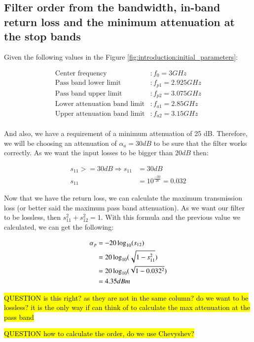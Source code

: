 \documentclass[12pt]{report} %
\newcommand{\question}[1]{\sethlcolor{red}\hl{QUESTION #1}}
\begin{document}
\subsection{Filter order from the bandwidth, in-band return loss and the minimum attenuation at the stop bands}

Given the following values in the Figure \ref{fig:introduction:initial_parameters}:

\begin{align*}
\text{Center frequency} & : f_0 = 3 GHz\\
\text{Pass band lower limit} & : f_{p1} = 2.925 GHz\\
\text{Pass band upper limit} & : f_{p2} = 3.075 GHz\\
\text{Lower attenuation band limit} & : f_{a1} = 2.85 GHz\\
\text{Upper attenuation band limit} & : f_{a2} = 3.15 GHz\\
\end{align*}

And also, we have a requirement of a minimum attenuation of 25 dB. Therefore, we will be choosing an attenuation of $\alpha_{a} = 30 dB$ to be sure that the filter works correctly. As we want the input losses to be bigger than $20 dB$ then:

\begin{align*}
s_{11} >= 30 dB \Rightarrow s_{11} &= 30 dB \\
s_{11} &= 10^{\frac{-30}{20}} = 0.032
\end{align*}

Now that we have the return loss, we can calculate the maximum transmission loss (or better said the maximum pass band attenuation). As we want our filter to be lossless, then $s_{11}^2 + s_{12}^2 = 1$. With this formula and the previous value we calculated, we can get the following:

\begin{align*}
\alpha_{p} &= - 20 \* \log_{10}(s_{12}) \\
&= \-20 \* \log_{10}(\sqrt{1 - s_{11}^2}) \\
&= \-20 \* \log_{10}(\sqrt{1 - 0.032^2}) \\
&= 4.35 dBm
\end{align*}

\question{is this right? as they are not in the same column? do we want to be lossless? it is the only way if can think of to calculate the max attenuation at the pass band}

\question{how to calculate the order, do we use Chevyshev?}
\end{document}
